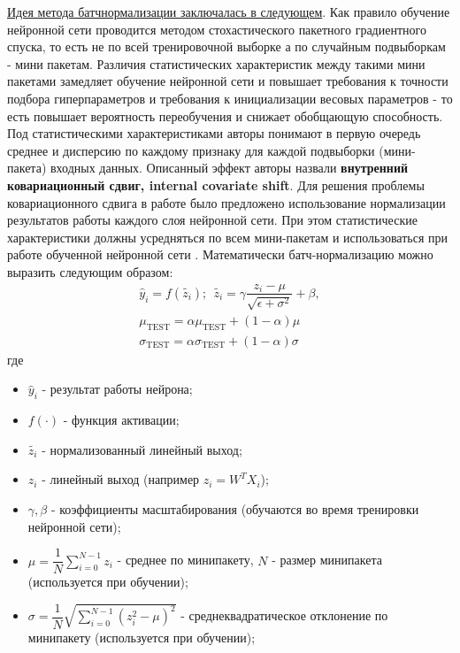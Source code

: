 \documentclass[12pt]{article}
\begin{document}
\begin{sloppypar}
\uline{Идея метода батчнормализации заключалась в следующем}. Как правило обучение нейронной сети проводится методом стохастического пакетного градиентного спуска, то есть не по всей тренировочной выборке а по случайным подвыборкам - мини пакетам. Различия статистических характеристик между такими мини пакетами замедляет обучение нейронной сети и повышает требования к точности подбора гиперпараметров и требования к инициализации весовых параметров - то есть повышает вероятность переобучения и снижает обобщающую способность. Под статистическими характеристиками авторы понимают в первую очередь среднее и дисперсию по каждому признаку для каждой подвыборки (мини-пакета) входных данных. Описанный эффект авторы назвали \textbf{внутренний ковариационный сдвиг, internal covariate shift}. Для решения проблемы ковариационного сдвига в работе \cite{ioffe2015batch} было предложено использование нормализации результатов работы каждого слоя нейронной сети. При этом статистические характеристики должны усредняться по всем мини-пакетам и использоваться при работе обученной нейронной сети \cite{ioffe2015batch}. Математически батч-нормализацию можно выразить следующим образом:
\begin{equation}
    \begin{split}
    \label{ch1:eqn:BN}
   \hat y_i = f(\tilde{z_i}); \ \ \tilde{z_i} = \gamma\dfrac{z_i-\mu}{\sqrt{\epsilon+\sigma^2}}+\beta, 
    \\
    \mu_{\mathrm{TEST}} = \alpha  \mu_{\mathrm{TEST}} + (1-\alpha) \mu
    \\
    \sigma_{\mathrm{TEST}} = \alpha  \sigma_{\mathrm{TEST}} + (1-\alpha) \sigma
    \end{split}
\end{equation}
где 
\begin{itemize}
\itemsep 0.1em 
    \item $\hat y_i$ - результат работы нейрона;
    \item $f(\cdot)$ - функция активации; 
    \item $\tilde{z_i}$ - нормализованный линейный выход;
    \item $z_i$ - линейный выход (например $z_i = W^TX_i$);
    \item $\gamma, \beta$ - коэффициенты масштабирования (обучаются во время тренировки нейронной сети);
    \item $\mu = \dfrac{1}{N}\sum_{i=0}^{N-1} z_i$ - среднее по минипакету, \newline $N$ - размер минипакета (используется при обучении);
    \item $\sigma = \dfrac{1}{N}\sqrt{\sum_{i=0}^{N-1}(z_i^2 - \mu)^2}$ - среднеквадратическое отклонение по минипакету (используется при обучении);

\end{itemize}
\end{sloppypar}
\end{document}
